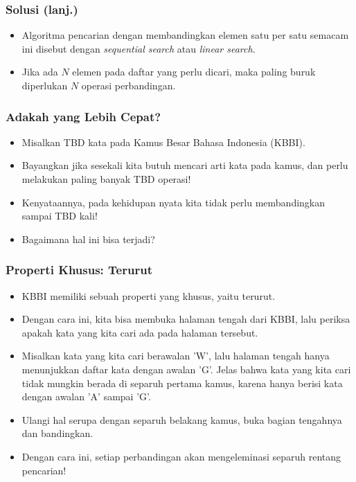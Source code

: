 \documentclass{beamer}
\begin{document}
\begin{frame}
\frametitle{Solusi (lanj.)}
\begin{itemize}
	\item Algoritma pencarian dengan membandingkan elemen satu per satu semacam ini disebut dengan \alert{\textit{sequential search}} atau \alert{\textit{linear search}}.
	\item Jika ada $N$ elemen pada daftar yang perlu dicari, maka paling buruk diperlukan $N$ operasi perbandingan.
\end{itemize}
\end{frame}

\begin{frame}
\frametitle{Adakah yang Lebih Cepat?}
\begin{itemize}
	\item Misalkan \alert{TBD} kata pada Kamus Besar Bahasa Indonesia (KBBI).
	\item Bayangkan jika sesekali kita butuh mencari arti kata pada kamus, dan perlu melakukan paling banyak \alert{TBD} operasi!
	\item Kenyataannya, pada kehidupan nyata kita tidak perlu membandingkan sampai \alert{TBD} kali!
	\item Bagaimana hal ini bisa terjadi?
\end{itemize}
\end{frame}

\begin{frame}
\frametitle{Properti Khusus: Terurut}
\begin{itemize}
	\item KBBI memiliki sebuah properti yang khusus, yaitu \alert{terurut}.
	\item Dengan cara ini, kita bisa membuka halaman tengah dari KBBI, lalu periksa apakah kata yang kita cari ada pada halaman tersebut.
	\item Misalkan kata yang kita cari berawalan 'W', lalu halaman tengah hanya menunjukkan daftar kata dengan awalan 'G'. Jelas bahwa kata yang kita cari tidak mungkin berada di \alert{separuh pertama} kamus, karena hanya berisi kata dengan awalan 'A' sampai 'G'.
	\item Ulangi hal serupa dengan separuh belakang kamus, buka bagian tengahnya dan bandingkan.
	\item Dengan cara ini, setiap perbandingan akan mengeleminasi separuh rentang pencarian!
\end{itemize}
\end{frame}
\end{document}
